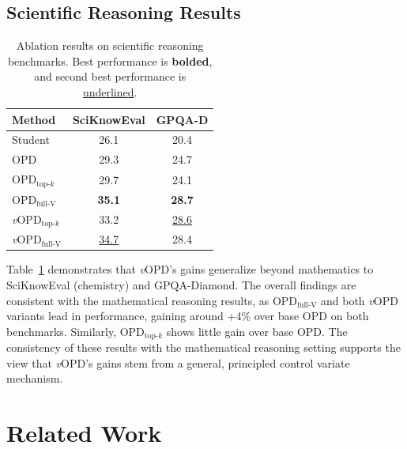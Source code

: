 \documentclass{article}
\newcommand{\method}{\emph{v}OPD}
\begin{document}
\subsection{Scientific Reasoning Results}
\label{sec:exp-sci}
\begin{table}
\vspace{-1.25em}
\centering
\caption{Ablation results on scientific reasoning benchmarks. Best performance is \textbf{bolded}, and second best performance is \underline{underlined}.}
\label{tab:science-ablation}
\small
\setlength{\tabcolsep}{5pt}
\begin{tabular}{l|cc}
\toprule
\textbf{Method} & \textbf{SciKnowEval} & \textbf{GPQA-D} \\
\midrule
Student
& 26.1 & 20.4 \\
OPD
& 29.3 & 24.7 \\
OPD$_{\text{top-}k}$
& 29.7 & 24.1 \\
OPD$_{\text{full-V}}$
& \textbf{35.1} & \textbf{28.7} \\
\rowcolor{blue!10}
\method{}$_{\text{top-}k}$
& 33.2 & \underline{28.6} \\
\rowcolor{blue!10}
\method{}$_{\text{full-V}}$
& \underline{34.7} & 28.4 \\
\bottomrule
\end{tabular}
\vspace{-1.0em}
\end{table}
Table~\ref{tab:science-ablation} demonstrates that \method{}'s gains generalize beyond mathematics to SciKnowEval (chemistry) and GPQA-Diamond. The overall findings are consistent with the mathematical reasoning results, as $\text{OPD}_\text{full-V}$ and both \method{} variants lead in performance, gaining around +4\% over base OPD on both benchmarks. Similarly, $\text{OPD}_\text{top-$k$}$ shows little gain over base OPD. The consistency of these results with the mathematical reasoning setting supports the view that \method{}'s gains stem from a general, principled control variate mechanism.

\section{Related Work}
\end{document}
